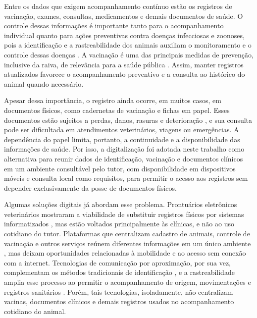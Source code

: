 \documentclass{UNESC}
\begin{document}
Entre os dados que exigem acompanhamento contínuo estão os registros de vacinação, exames, consultas, medicamentos e demais documentos de saúde. O controle dessas informações é importante tanto para o acompanhamento individual quanto para ações preventivas contra doenças infecciosas e zoonoses, pois a identificação e a rastreabilidade dos animais auxiliam o monitoramento e o controle dessas doenças \cite{murphy2008}. A vacinação é uma das principais medidas de prevenção, inclusive da raiva, de relevância para a saúde pública \cite{MOUTINHO2017}. Assim, manter registros atualizados favorece o acompanhamento preventivo e a consulta ao histórico do animal quando necessário.

Apesar dessa importância, o registro ainda ocorre, em muitos casos, em documentos físicos, como cadernetas de vacinação e fichas em papel. Esses documentos estão sujeitos a perdas, danos, rasuras e deterioração \cite{BOLSON2022}, e sua consulta pode ser dificultada em atendimentos veterinários, viagens ou emergências. A dependência do papel limita, portanto, a continuidade e a disponibilidade das informações de saúde. Por isso, a digitalização foi adotada neste trabalho como alternativa para reunir dados de identificação, vacinação e documentos clínicos em um ambiente consultável pelo tutor, com disponibilidade em dispositivos móveis e consulta local como requisitos, para permitir o acesso aos registros sem depender exclusivamente da posse de documentos físicos.

Algumas soluções digitais já abordam esse problema. Prontuários eletrônicos veterinários mostraram a viabilidade de substituir registros físicos por sistemas informatizados \cite{iskandar2023}, mas estão voltados principalmente às clínicas, e não ao uso cotidiano do tutor. Plataformas que centralizam cadastro de animais, controle de vacinação e outros serviços reúnem diferentes informações em um único ambiente \cite{vieira2025}, mas deixam oportunidades relacionadas à mobilidade e ao acesso sem conexão com a internet. Tecnologias de comunicação por aproximação, por sua vez, complementam os métodos tradicionais de identificação \cite{sartori2018}, e a rastreabilidade amplia esse processo ao permitir o acompanhamento de origem, movimentações e registros sanitários \cite{zhao2020}. Porém, tais tecnologias, isoladamente, não centralizam vacinas, documentos clínicos e demais registros usados no acompanhamento cotidiano do animal.
\end{document}
